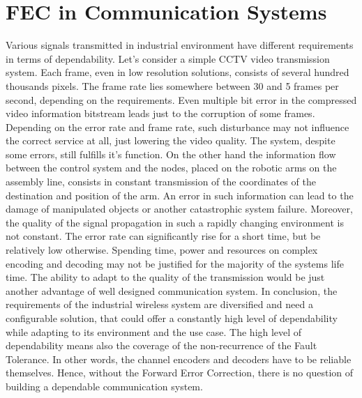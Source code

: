 \section{FEC in Communication Systems}
Various signals transmitted in industrial environment have different requirements in terms of dependability. Let's consider a simple CCTV video transmission system. Each frame, even in low resolution solutions, consists of several hundred thousands pixels. The frame rate lies somewhere between 30 and 5 frames per second, depending on the requirements. Even multiple bit error in the compressed video information bitstream leads just to the corruption of some frames. Depending on the error rate and frame rate, such disturbance may not influence the correct service at all, just lowering the video quality. The system, despite some errors, still fulfills it's function. 
On the other hand the information flow between the control system and the nodes, placed on the robotic arms on the assembly line, consists in constant transmission of the coordinates of the destination and position of the arm. An error in such information can lead to the damage of manipulated objects or another catastrophic system failure.
Moreover, the quality of the signal propagation in such a rapidly changing environment is not constant. The error rate can significantly rise for a short time, but be relatively low otherwise. Spending time, power and resources on complex encoding and decoding may not be justified for the majority of the systems life time. The ability to adapt to the quality of the transmission would be just another advantage of well designed communication system.
In conclusion, the requirements of the industrial wireless system are diversified and need a configurable solution, that could offer a constantly high level of dependability while adapting to its environment and the use case. The high level of dependability means also the coverage of the non-recurrence of the Fault Tolerance. In other words, the channel encoders and decoders have to be reliable themselves. Hence, without the Forward Error Correction, there is no question of building a dependable communication system.

